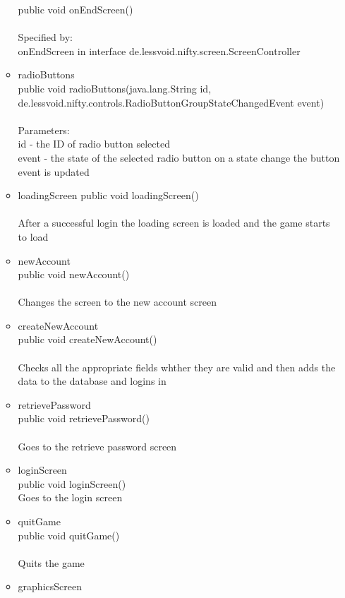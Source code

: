 \documentclass[letterpaper]{article}
\begin{document}
\begin{itemize}
\begin{itemize}
												public void onEndScreen() \\ \\
												Specified by: \\
												onEndScreen in interface de.lessvoid.nifty.screen.ScreenController
										\item	radioButtons \\
												public void radioButtons(java.lang.String id, de.lessvoid.nifty.controls.RadioButtonGroupStateChangedEvent event) \\ \\
												Parameters: \\
												id - the ID of radio button selected \\
												event - the state of the selected radio button on a state change the button event is updated
										\item	loadingScreen
												public void loadingScreen() \\ \\
												After a successful login the loading screen is loaded and the game starts to load
										\item	newAccount \\
												public void newAccount() \\ \\
												Changes the screen to the new account screen
										\item	createNewAccount \\
												public void createNewAccount() \\ \\
												Checks all the appropriate fields whther they are valid and then adds the data to the database and logins in
										\item	retrievePassword \\
												public void retrievePassword() \\ \\
												Goes to the retrieve password screen
										\item	loginScreen \\
												public void loginScreen() \\
												Goes to the login screen
										\item	quitGame \\
												public void quitGame() \\ \\
												Quits the game
										\item	graphicsScreen \\

\end{itemize}
\end{itemize}
\end{document}

